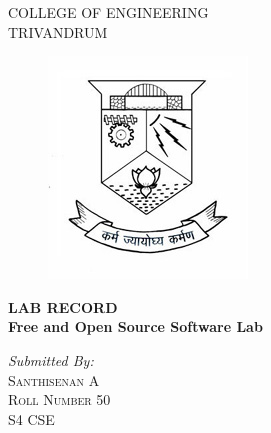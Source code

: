 \documentclass{article}
\newenvironment{bottompar}{\par\vspace*{\fill}}{\clearpage}
\begin{document}
\newcommand{\HRule}{\rule{\linewidth}{0.5mm}} 
\begin{titlepage}

\center

\textsc{\LARGE COLLEGE OF ENGINEERING }\\[1.0 cm]
\textsc{\Large TRIVANDRUM}\\[0.5cm]
\vspace{20px}
\begin{figure}[h!]
     \includegraphics[width=\linewidth]{./logo/cet.jpg}
\end{figure}
\begin{bottompar}
{ \huge \bfseries LAB RECORD}\\[0.4cm] 
{ \large \bfseries Free and Open Source Software Lab}\\[0.4cm] 
\end{bottompar}


\begin{bottompar}
\emph{Submitted By:}\\
\textsc{\Large Santhisenan A \\
 Roll Number 50 \\
 S4 CSE\\
 } 
 \end{bottompar}




\vfill



\end{titlepage}
\newpage
\tableofcontents{}
\end{document}
